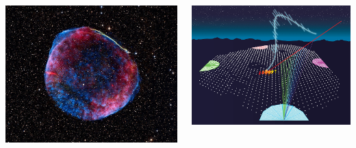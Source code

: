 \documentclass[10pt,xcolor=table]{beamer}
\begin{document}
\begin{frame}
\begin{columns}
		\begin{column}{0.5\textwidth}
		\center
		\includegraphics[width=1\textwidth]{Figuras/snr}
		\end{column}
		
		\begin{column}{0.5\textwidth}
		\center
		\includegraphics[width=1\textwidth]{Figuras/surfacedetector}
		\end{column}
\end{columns}
\end{frame}
\end{document}
